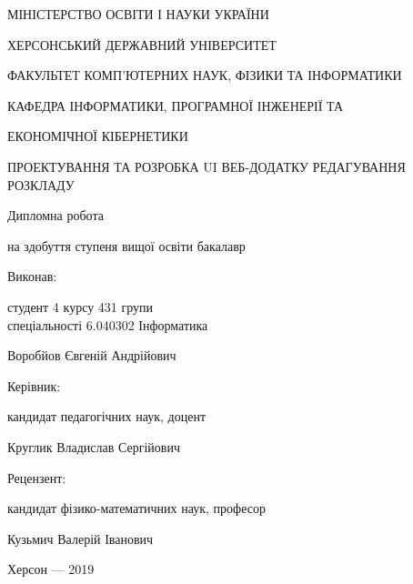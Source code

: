 \thispagestyle{empty}

{\centering
МІНІСТЕРСТВО ОСВІТИ І НАУКИ УКРАЇНИ

ХЕРСОНСЬКИЙ ДЕРЖАВНИЙ УНІВЕРСИТЕТ

ФАКУЛЬТЕТ КОМП'ЮТЕРНИХ НАУК, ФІЗИКИ ТА ІНФОРМАТИКИ

КАФЕДРА ІНФОРМАТИКИ, ПРОГРАМНОЇ ІНЖЕНЕРІЇ ТА 

ЕКОНОМІЧНОЇ КІБЕРНЕТИКИ

\vfill

ПРОЕКТУВАННЯ ТА РОЗРОБКА UI ВЕБ-ДОДАТКУ РЕДАГУВАННЯ РОЗКЛАДУ

Дипломна робота

на здобуття ступеня вищої освіти бакалавр

}

\vfill

\hfill\begin{minipage}[t]{0.6\textwidth}
Виконав: 

студент 4 курсу 431 групи \\ спеціальності 6.040302  Інформатика

Воробйов Євгеній Андрійович

Керівник:

кандидат педагогічних наук, доцент

Круглик Владислав Сергійович

Рецензент:

кандидат фізико-математичних наук, професор

Кузьмич Валерій Іванович


\end{minipage}

\vfill

{\centering
Херсон --- 2019

}